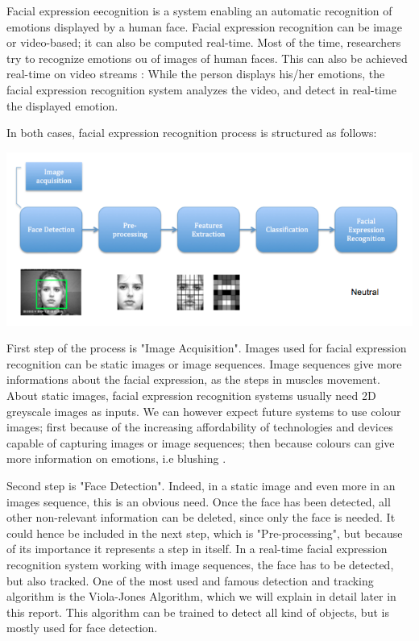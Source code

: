 \noindent Facial expression eecognition is a system enabling an automatic recognition of emotions displayed by a human face. Facial expression recognition can be image or video-based; it can also be computed real-time. Most of the time, researchers try to recognize emotions ou of images of human faces. This can also be achieved real-time on video streams : While the person displays his/her emotions, the facial expression recognition system analyzes the video, and detect in real-time the displayed emotion.
\newline

\noindent In both cases, facial expression recognition process is structured as follows:


\noindent \includegraphics[scale=0.6]{figures/facial_expression_recognition_process}

\noindent First step of the process is "Image Acquisition". Images used for facial expression recognition can be static images or image sequences. Image sequences give more informations about the facial expression, as the steps in muscles movement. About static images, facial expression recognition systems usually need 2D greyscale images as inputs. We can however expect future systems to use colour images; first because of the increasing affordability of technologies and devices capable of capturing images or image sequences; then because colours can give more information on emotions, i.e blushing \cite{CHI03}.
\newline

\noindent Second step is "Face Detection". Indeed, in a static image and even more in an images sequence, this is an obvious need. Once the face has been detected, all other non-relevant information can be deleted, since only the face is needed. It could hence be included in the next step, which is "Pre-processing", but because of its importance it represents a step in itself. In a real-time facial expression recognition system working with image sequences, the face has to be detected, but also tracked. One of the most used and famous detection and tracking algorithm is the Viola-Jones Algorithm, which we will explain in detail later in this report. This algorithm can be trained to detect all kind of objects, but is mostly used for face detection. 
\newline

